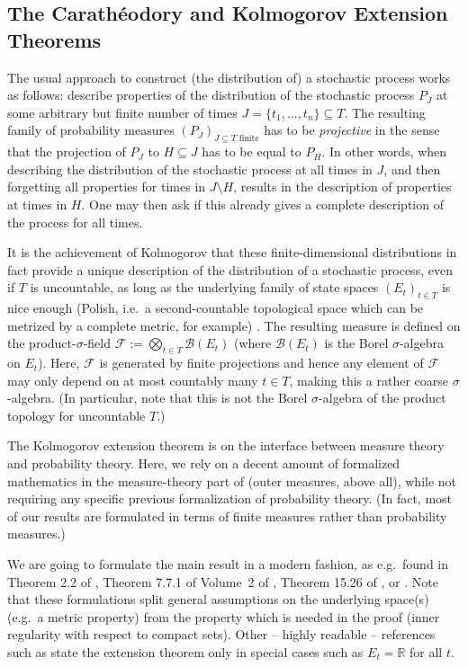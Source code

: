 \documentclass[lean]{Draft}
\begin{document}
\subsection{The Carathéodory and Kolmogorov Extension Theorems}
The usual approach to construct (the distribution of) a stochastic process works as follows: describe properties of the distribution of the stochastic process $P_J$ at some arbitrary but finite number of times $J = \{t_1,...,t_n\} \subseteq T$.
The resulting family of probability measures $(P_J)_{J \subseteq T \text{ finite}}$ has to be {\em projective} in the sense that the projection of $P_J$ to $H\subseteq J$ has to be equal to $P_H$. In other words, when describing the distribution of the stochastic process at all times in $J$, and then forgetting all properties for times in $J\setminus H$, results in the description of properties at times in $H$. One may then ask if this already gives a complete description of the process for all times.

It is the achievement of Kolmogorov that these finite-dimensional distributions in fact provide a unique description of the distribution of a stochastic process, even if $T$ is uncountable, as long as the underlying family of state spaces $(E_t)_{t\in T}$ is nice enough (Polish, i.e.\ a second-countable topological space which can be metrized by a complete metric, for example) \cite{kolmogoroff1933grundbegriffe}.
The resulting measure is defined on the product-$\sigma$-field $\mathcal F :=\bigotimes_{t\in T} \mathcal B(E_t)$ (where $\mathcal B(E_t)$ is the Borel $\sigma$-algebra on $E_t$). Here, $\mathcal F$ is generated by finite projections and hence any element of $\mathcal F$ may only depend on at most countably many $t\in T$, making this a rather coarse $\sigma$-algebra. (In particular, note that this is not the Borel $\sigma$-algebra of the product topology for uncountable $T$.)

The Kolmogorov extension theorem is on the interface between measure theory and probability theory. Here, we rely on a decent amount of formalized mathematics in the measure-theory part of \mathlib (outer measures, above all), while not requiring any specific previous formalization of probability theory. (In fact, most of our results are formulated in terms of finite measures rather than probability measures.)

We are going to formulate the main result in a modern fashion, as e.g.\ found in Theorem 2.2 of \cite{rao1971projective}, Theorem 7.7.1 of Volume~2 of \cite{bogachev2007measure}, Theorem 15.26 of \cite{guide2006infinite}, or \cite{border1998expository}. Note that these formulations split general assumptions on the underlying space(s) (e.g.\ a metric property) from the property which is needed in the proof (inner regularity with respect to compact sets). Other -- highly readable -- references such as \cite{Billingsley1995} state the extension theorem only in special cases such as $E_t = \mathbb R$ for all $t$.
\end{document}
